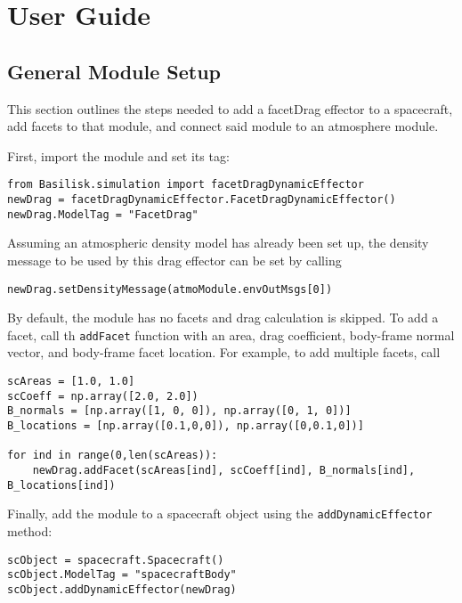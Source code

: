 
\section{User Guide}

\subsection{General Module Setup}
This section outlines the steps needed to add a facetDrag effector to a spacecraft, add facets to that module, and connect said module to an atmosphere module.

First, import the module and set its tag:
\begin{verbatim}
from Basilisk.simulation import facetDragDynamicEffector
newDrag = facetDragDynamicEffector.FacetDragDynamicEffector()
newDrag.ModelTag = "FacetDrag"
\end{verbatim}

Assuming an atmospheric density model has already been set up, the density message to be used by this drag effector can be set by calling
\begin{verbatim}
newDrag.setDensityMessage(atmoModule.envOutMsgs[0])
\end{verbatim}

By default, the module has no facets and drag calculation is skipped. To add a facet, call th \verb|addFacet| function with an area, drag coefficient, body-frame normal vector, and body-frame facet location. For example, to add multiple facets, call
\begin{verbatim}
scAreas = [1.0, 1.0]
scCoeff = np.array([2.0, 2.0])
B_normals = [np.array([1, 0, 0]), np.array([0, 1, 0])]
B_locations = [np.array([0.1,0,0]), np.array([0,0.1,0])]

for ind in range(0,len(scAreas)):
	newDrag.addFacet(scAreas[ind], scCoeff[ind], B_normals[ind], B_locations[ind])
\end{verbatim}


Finally, add the module to a spacecraft object using the \verb|addDynamicEffector| method:
\begin{verbatim}
scObject = spacecraft.Spacecraft()
scObject.ModelTag = "spacecraftBody"
scObject.addDynamicEffector(newDrag)
\end{verbatim}

